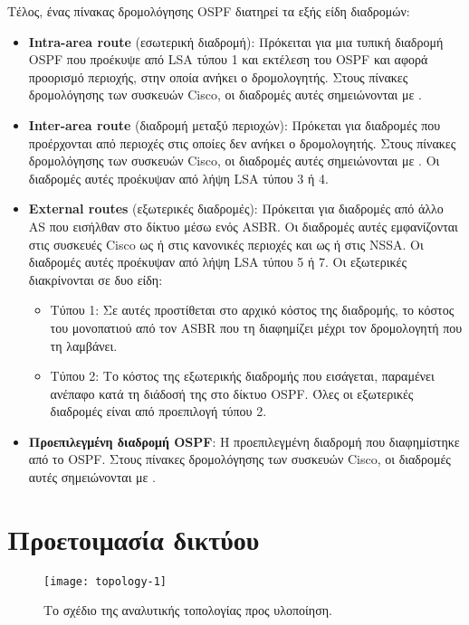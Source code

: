 \documentclass{EdipyLabs} %
\begin{document}
Τέλος, ένας πίνακας δρομολόγησης OSPF διατηρεί τα εξής είδη διαδρομών:
\begin{itemize}
	\item \textbf{Intra-area route} (εσωτερική διαδρομή): Πρόκειται για μια τυπική διαδρομή OSPF που προέκυψε από LSA τύπου 1 και εκτέλεση του OSPF και αφορά προορισμό περιοχής, στην οποία ανήκει ο δρομολογητής. Στους πίνακες δρομολόγησης των συσκευών Cisco, οι διαδρομές αυτές σημειώνονται με .
	
	\item \textbf{Inter-area route} (διαδρομή μεταξύ περιοχών): Πρόκεται για διαδρομές που προέρχονται από περιοχές στις οποίες δεν ανήκει ο δρομολογητής. Στους πίνακες δρομολόγησης των συσκευών Cisco, οι διαδρομές αυτές σημειώνονται με . Οι διαδρομές αυτές προέκυψαν από λήψη LSA τύπου 3 ή 4.
	
	\item \textbf{External routes} (εξωτερικές διαδρομές): Πρόκειται για διαδρομές από άλλο AS που εισήλθαν στο δίκτυο μέσω ενός ASBR. Οι διαδρομές αυτές εμφανίζονται στις συσκευές Cisco ως  ή  στις κανονικές περιοχές και ως  ή  στις NSSA. Οι διαδρομές αυτές προέκυψαν από λήψη LSA τύπου 5 ή 7. Οι εξωτερικές διακρίνονται σε δυο είδη:
	\begin{itemize}
	 \item Τύπου 1: Σε αυτές προστίθεται στο αρχικό κόστος της διαδρομής, το κόστος του μονοπατιού από τον ASBR που τη διαφημίζει μέχρι τον δρομολογητή που τη λαμβάνει. 
	 \item Τύπου 2: Το κόστος της εξωτερικής διαδρομής που εισάγεται, παραμένει ανέπαφο κατά τη διάδοσή της στο δίκτυο OSPF. Όλες οι εξωτερικές διαδρομές είναι από προεπιλογή τύπου 2.  
	\end{itemize}
	\item \textbf{Προεπιλεγμένη διαδρομή OSPF}: H προεπιλεγμένη διαδρομή που διαφημίστηκε από το OSPF. Στους πίνακες δρομολόγησης των συσκευών Cisco, οι διαδρομές αυτές σημειώνονται με .
\end{itemize}

\newpage

\section{Προετοιμασία δικτύου}

\begin{figure}[H]
	\centering
	\texttt{[image: topology-1]}
	\caption{Το σχέδιο της αναλυτικής τοπολογίας προς υλοποίηση.}\label{fig:topology1}
\end{figure}
\end{document}
